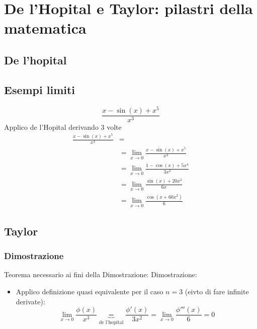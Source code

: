 \section{De l'Hopital e Taylor: pilastri della matematica}
\subsection{De l'hopital}
\subsection{Esempi limiti}

\[
	\frac{x - \sin  \left( x \right)  + x^{5}}{x^{3}}
\] 
	 Applico de l'Hopital derivando 3 volte
	 \begin{align*}
		\frac{x - \sin  \left( x \right)  + x^{5}}{x^{3}} &= \\
		&= \lim_{x \to 0} \frac{x - \sin \left( x \right)  + x^{5}}{x^3}   \\
		&= \lim_{x \to 0} \frac{1 - \cos \left( x \right)  + 5x^{4}}{3 x ^2}\\
		&= \lim_{x \to 0} \frac{\sin \left( x \right)  + 20 x^3}{6x} \\
		&=\lim_{x \to 0} \frac{\cos \left( x + 60x^2 \right) }{6} 
	 \end{align*}

\subsection{Taylor}
\subsubsection{Dimostrazione}
Teorema necessario ai fini della Dimostrazione:
Dimostrazione:
\begin{itemize}
	\item Applico definizione quasi equivalente per il caso $n=3$ (eivto di fare infinite derivate):
		\[
			\lim_{x \to 0} \frac{\phi \left( x \right) }{x^3} \underbrace{=}_{\text{de l'hopital}} \frac{\phi ' \left( x \right)}{3x^2} = \lim_{x \to 0} \frac{\phi ''' \left( x \right) }{6} = 0  		
		\] 
\end{itemize}
